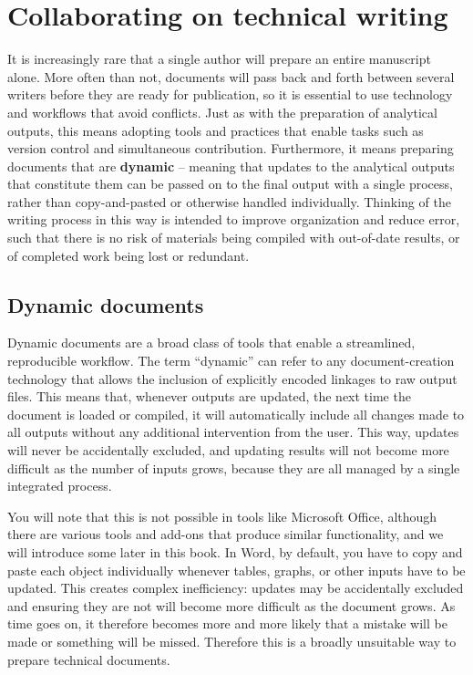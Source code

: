\section{Collaborating on technical writing}

It is increasingly rare that a single author will prepare an entire manuscript alone.
More often than not, documents will pass back and forth between several writers
before they are ready for publication,
so it is essential to use technology and workflows that avoid conflicts.
Just as with the preparation of analytical outputs,
this means adopting tools and practices that enable tasks
such as version control and simultaneous contribution.
Furthermore, it means preparing documents that are \textbf{dynamic} --
meaning that updates to the analytical outputs that constitute them
can be passed on to the final output with a single process,
rather than copy-and-pasted or otherwise handled individually.
Thinking of the writing process in this way
is intended to improve organization and reduce error,
such that there is no risk of materials being compiled
with out-of-date results, or of completed work being lost or redundant.

\subsection{Dynamic documents}

Dynamic documents are a broad class of tools that enable a streamlined, reproducible workflow.
The term ``dynamic'' can refer to any document-creation technology
that allows the inclusion of explicitly encoded linkages to raw output files.
This means that, whenever outputs are updated,
the next time the document is loaded or compiled, it will automatically include
all changes made to all outputs without any additional intervention from the user.
This way, updates will never be accidentally excluded,
and updating results will not become more difficult
as the number of inputs grows,
because they are all managed by a single integrated process.

You will note that this is not possible in tools like Microsoft Office,
although there are various tools and add-ons that produce similar functionality,
and we will introduce some later in this book.
In Word, by default, you have to copy and paste each object individually
whenever tables, graphs, or other inputs have to be updated.
This creates complex inefficiency: updates may be accidentally excluded
and ensuring they are not will become more difficult as the document grows.
As time goes on, it therefore becomes more and more likely
that a mistake will be made or something will be missed.
Therefore this is a broadly unsuitable way to prepare technical documents.

